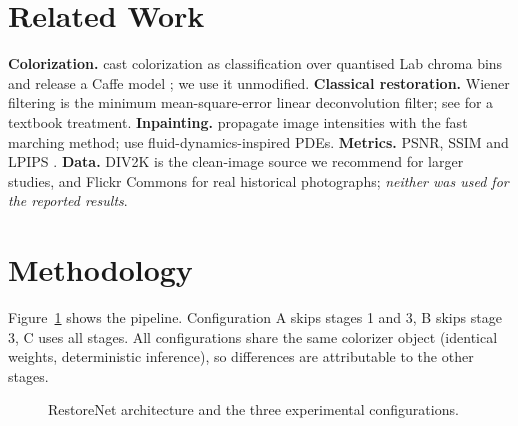 \documentclass[10pt]{article}
\begin{document}
\section{Related Work}
\textbf{Colorization.} \citet{zhang2016colorful} cast colorization as classification over quantised Lab chroma bins and release a Caffe model \citep{jia2014caffe}; we use it unmodified.
\textbf{Classical restoration.} Wiener filtering \citep{wiener1949extrapolation} is the minimum mean-square-error linear deconvolution filter; see \citet{gonzalez2018digital} for a textbook treatment.
\textbf{Inpainting.} \citet{telea2004inpainting} propagate image intensities with the fast marching method; \citet{bertalmio2001navier} use fluid-dynamics-inspired PDEs.
\textbf{Metrics.} PSNR, SSIM \citep{wang2004ssim} and LPIPS \citep{zhang2018lpips}.
\textbf{Data.} DIV2K \citep{agustsson2017div2k} is the clean-image source we recommend for larger studies, and Flickr Commons \citep{flickrcommons} for real historical photographs; \emph{neither was used for the reported results}.

\section{Methodology}
Figure~\ref{fig:arch} shows the pipeline. Configuration A skips stages 1 and 3, B skips stage 3, C uses all stages. All configurations share the same
colorizer object (identical weights, deterministic inference), so differences are attributable to the other stages.
\begin{figure}[t]
\centering
{}
\caption{RestoreNet architecture and the three experimental configurations.}\label{fig:arch}
\end{figure}
\end{document}

